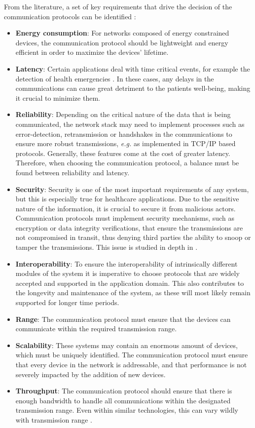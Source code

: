 From the literature, a set of key requirements that drive the decision of the communication protocols can be identified \cite{Baker2017, Catarinucci2015, Adame2018}:

\begin{itemize}
    \item \textbf{Energy consumption}: For networks composed of energy constrained devices, the communication protocol should be lightweight and energy efficient in order to maximize the devices' lifetime. 
    \item \textbf{Latency}: Certain applications deal with time critical events, for example the detection of health emergencies \cite{Catarinucci2015}. In these cases, any delays in the communications can cause great detriment to the patients well-being, making it crucial to minimize them.
    \item \textbf{Reliability}: Depending on the critical nature of the data that is being communicated, the network stack may need to implement processes such as error-detection, retransmission or handshakes in the communications to ensure more robust transmissions, \textit{e.g.} as implemented in TCP/IP based protocols. Generally, these features come at the cost of greater latency. Therefore, when choosing the communication protocol, a balance must be found between reliability and latency.
    \item \textbf{Security}: Security is one of the most important requirements of any system, but this is especially true for healthcare applications. Due to the sensitive nature of the information, it is crucial to secure it from malicious actors. Communication protocols must implement security mechanisms, such as encryption or data integrity verifications, that ensure the transmissions are not compromised in transit, thus denying third parties the ability to snoop or tamper the transmissions. This issue is studied in depth in \cite{Gope2016}.
    \item \textbf{Interoperability}: To ensure the interoperability of intrinsically different modules of the system it is imperative to choose protocols that are widely accepted and supported in the application domain. This also contributes to the longevity and maintenance of the system, as these will most likely remain supported for longer time periods. 
    \item \textbf{Range}: The communication protocol must ensure that the devices can communicate within the required transmission range.
    \item \textbf{Scalability}: These systems may contain an enormous amount of devices, which must be uniquely identified. The communication protocol must ensure that every device in the network is addressable, and that performance is not severely impacted by the addition of new devices.
    \item \textbf{Throughput}: The communication protocol should ensure that there is enough bandwidth to handle all communications within the designated transmission range. Even within similar technologies, this can vary wildly with transmission range \cite{10.5555/3161403}.
\end{itemize}

